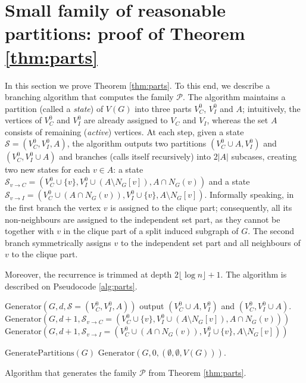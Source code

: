 \documentclass{article}
\theoremstyle{definition}
\begin{document}
\section{Small family of reasonable partitions: proof of Theorem \ref{thm:parts}}\label{sec:parts}
\newcommand{\stan}{\ensuremath{\mathcal{S}}}

In this section we prove Theorem \ref{thm:parts}.
To this end, we describe a branching algorithm that
computes the family $\mathcal{P}$. The algorithm
maintains a partition (called a {\em{state}}) of $V(G)$ into three parts $V_C^0$, $V_I^0$ and $A$;
intuitively, the vertices of $V_C^0$ and $V_I^0$ are already assigned
to $V_C$ and $V_I$, whereas the set $A$ consists of remaining ({\em{active}}) vertices.
At each step, given a state $\stan = (V_C^0,V_I^0,A)$, the algorithm
outputs two partitions $(V_C^0 \cup A, V_I^0)$ and $(V_C^0,V_I^0 \cup A)$
and branches (calls itself recursively) into $2|A|$ subcases,
creating two new states for each $v \in A$:
a state
$\stan_{v \to C} = (V_C^0 \cup \{v\}, V_I^0 \cup (A \setminus N_G[v]), A \cap N_G(v))$
and a state
$\stan_{v \to I} = (V_C^0 \cup (A \cap N_G(v)), V_I^0 \cup \{v\}, A \setminus N_G[v])$.
Informally speaking, in the first branch the vertex $v$ is assigned to the clique part; consequently,
all its non-neighbours are assigned to the independent set part, as they cannot be together with $v$
in the clique part of a split induced subgraph of $G$. The second branch symmetrically assigns
$v$ to the independent set part and all neighbours of $v$ to the clique part.

Moreover, the recurrence is trimmed at depth $2\lfloor \log n \rfloor + 1$.
The algorithm is described on Pseudocode \ref{alg:parts}.

\begin{algorithm}
\begin{algorithmic}[1]
\REQUIRE $\mathrm{Generator}(G,d,\stan=(V_C^0,V_I^0,A))$
\COMMENT{$n=|V(G)|$ and $\stan=(V_C^0,V_I^0,A)$ is a partition of $V(G)$}
\STATE output $(V_C^0 \cup A, V_I^0)$ and $(V_C^0,V_I^0 \cup A)$.
    \STATE $\mathrm{Generator}(G,d+1,\stan_{v \to C} = (V_C^0 \cup \{v\}, V_I^0 \cup (A \setminus N_G[v]), A \cap N_G(v)))$
    \STATE $\mathrm{Generator}(G,d+1,\stan_{v \to I} = (V_C^0 \cup (A \cap N_G(v)), V_I^0 \cup \{v\}, A \setminus N_G[v]))$
  \ENDFOR
\ENDIF

\REQUIRE $\mathrm{GeneratePartitions}(G)$
\STATE $\mathrm{Generator}(G,0,(\emptyset,\emptyset,V(G)))$.
\end{algorithmic}
\caption{Algorithm that generates the family $\mathcal{P}$ from Theorem \ref{thm:parts}.}\label{alg:parts}
\end{algorithm}
\end{document}
